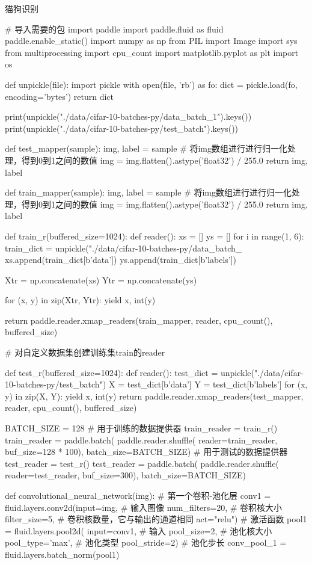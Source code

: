 \documentclass[openbib]{article}
\begin{document}
\begin{Python}{猫狗识别}

# 导入需要的包
import paddle
import paddle.fluid as fluid
paddle.enable_static()
import numpy as np
from PIL import Image
import sys
from multiprocessing import cpu_count
import matplotlib.pyplot as plt
import os

def unpickle(file):
	import pickle
	with open(file, 'rb') as fo:
	dict = pickle.load(fo, encoding='bytes')
	return dict


print(unpickle("./data/cifar-10-batches-py/data_batch_1").keys())
print(unpickle("./data/cifar-10-batches-py/test_batch").keys())

def test_mapper(sample):
	img, label = sample
	# 将img数组进行进行归一化处理，得到0到1之间的数值
	img = img.flatten().astype('float32') / 255.0
	return img, label

def train_mapper(sample):
	img, label = sample
	# 将img数组进行进行归一化处理，得到0到1之间的数值
	img = img.flatten().astype('float32') / 255.0
	return img, label

def train_r(buffered_size=1024):
	def reader():
		xs = []
		ys = []
		for i in range(1, 6):
			train_dict = unpickle("./data/cifar-10-batches-py/data_batch_%
			xs.append(train_dict[b'data'])
			ys.append(train_dict[b'labels'])
		
		Xtr = np.concatenate(xs)
		Ytr = np.concatenate(ys)
		
		for (x, y) in zip(Xtr, Ytr):
			yield x, int(y)
		
	return paddle.reader.xmap_readers(train_mapper, reader, cpu_count(), buffered_size)

# 对自定义数据集创建训练集train的reader

def test_r(buffered_size=1024):
	def reader():
		test_dict = unpickle("./data/cifar-10-batches-py/test_batch")
		X = test_dict[b'data']
		Y = test_dict[b'labels']
		for (x, y) in zip(X, Y):
			yield x, int(y)
	return paddle.reader.xmap_readers(test_mapper, reader, cpu_count(), buffered_size)

BATCH_SIZE = 128
# 用于训练的数据提供器
train_reader = train_r()
train_reader = paddle.batch(
							paddle.reader.shuffle(
							reader=train_reader, buf_size=128 * 100),
							batch_size=BATCH_SIZE)
# 用于测试的数据提供器
test_reader = test_r()
test_reader = paddle.batch(
							paddle.reader.shuffle(
							reader=test_reader, buf_size=300),
							batch_size=BATCH_SIZE)



def convolutional_neural_network(img):
	# 第一个卷积-池化层
	conv1 = fluid.layers.conv2d(input=img,  # 输入图像
								num_filters=20,  # 卷积核大小
								filter_size=5,  # 卷积核数量，它与输出的通道相同
								act="relu")  # 激活函数
	pool1 = fluid.layers.pool2d(
								input=conv1,  # 输入
								pool_size=2,  # 池化核大小
								pool_type='max',  # 池化类型
								pool_stride=2)  # 池化步长
	conv_pool_1 = fluid.layers.batch_norm(pool1)
	

\end{Python}
\end{document}
